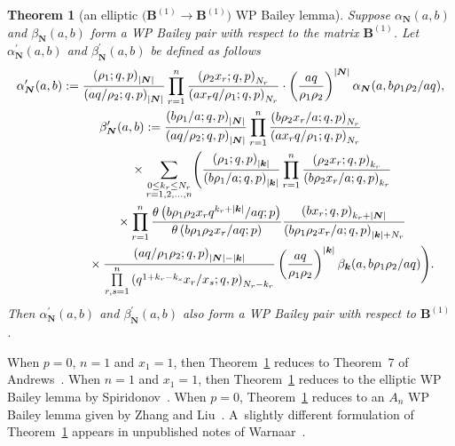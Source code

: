 \documentclass[pdftex]{sigma}
\numberwithin{equation}{section}
\newtheorem{Theorem}{Theorem}[section]
\newenvironment{Remark*}{\begin{remark*}\normalfont}{\end{remark*}}
\newcommand{\sumN}{{\left| \boldsymbol{N} \right|}}
\newcommand\sumk{{\left| \boldsymbol{k} \right|}}
\newcommand{\B}{{ \mathbf B}}
\newcommand{\N}{{ \boldsymbol N}}
\renewcommand{\k}{{ \boldsymbol{k}}}
\newcommand{\multsum}[3]{{\sum\limits_{\substack{{0\le #1_#3 \le #2_#3} \\
{#3 =1,2,\dots, n}}}}}
\newcommand{\sqprod}[1]{\prod\limits_{r, s =1}^{#1}} %
\newcommand{\smallprod}[1]{\prod\limits_{r =1}^{#1}} %
\newcommand{\xover}[1]{#1_{r}/#1_{s}}
\newcommand{\ellipticqrfac}[2]{{\left({#1}; q, p\right)_{#2}}} %
\newcommand{\elliptictheta}[1]{\theta \left({#1} ; p\right) }
\begin{document}
\begin{Theorem}[an elliptic $\big(\B^{(1)} \to\B^{(1)}\big)$ WP Bailey lemma] \label{th:e-WP-BaileyLemma-B1}
Suppose $\alpha_\N(a,b)$ and $\beta_\N(a,b)$ form a WP Bailey pair with respect to the matrix $\B^{(1)}$. Let ${\alpha}^{\prime}_\N(a,b)$ and ${\beta}^{\prime}_\N(a,b)$ be defined as follows
\begin{subequations}
\begin{gather}
{\alpha}^{\prime}_\N(a,b) := \frac{\ellipticqrfac{\rho_1 }{\sumN}}{\ellipticqrfac{aq/\rho_2}{\sumN}}
 \smallprod n \frac{\ellipticqrfac{\rho_2x_r}{N_r}} {\ellipticqrfac{ax_rq/\rho_1}{N_r}}
\cdot \left(\frac{aq}{\rho_1\rho_2}\right)^{\sumN} \alpha_\N(a, b\rho_1\rho_2/aq), \label{e-alphaprime-B1}\\
{\beta}^{\prime}_\N (a,b) :=
\frac{\ellipticqrfac{b\rho_1/a }{\sumN}}{\ellipticqrfac{aq/\rho_2}{\sumN}}
 \smallprod n \frac{\ellipticqrfac{b\rho_2x_r/a}{N_r}}{\ellipticqrfac{ax_rq/\rho_1}{N_r}}\notag \\
\hphantom{{\beta}^{\prime}_\N (a,b) :=}{} \times \multsum{k}{N}{r} \Bigg(
\frac{ \ellipticqrfac{\rho_1}{\sumk} }{\ellipticqrfac{b\rho_1/a}{\sumk}}
\smallprod n \frac{\ellipticqrfac{\rho_2x_r}{k_r}}
{\ellipticqrfac{b\rho_2x_r/a}{k_r}}
 \notag \\
\hphantom{{\beta}^{\prime}_\N (a,b) :=}{}
\times \smallprod n \frac{\elliptictheta{ b\rho_1\rho_2x_rq^{k_r+\sumk}/{aq}}}{\elliptictheta{ b\rho_1\rho_2x_r/{aq}}}
\frac{\ellipticqrfac{bx_r}{k_r+\sumN}}{\ellipticqrfac{b\rho_1\rho_2x_r/a}{\sumk+N_r}} \notag\\
\hphantom{{\beta}^{\prime}_\N (a,b) :=}{}
\times \frac{\ellipticqrfac{aq/\rho_1\rho_2}{\sumN-\sumk} }
{\sqprod n \ellipticqrfac{q^{1+k_r-k_s}\xover x }{N_r-k_r}}
\left(\frac{aq}{\rho_1\rho_2}\right)^{\sumk} \beta_\k(a,b\rho_1\rho_2/aq) \Bigg).\label{e-betaprime-B1}
\end{gather}
\end{subequations}
Then ${\alpha}^{\prime}_\N(a,b)$ and ${\beta}^{\prime}_\N(a,b)$ also form a WP Bailey pair with respect to $\B^{(1)}$.
\end{Theorem}

\begin{Remark*} When $p=0$, $n=1$ and $x_1=1$, then Theorem~\ref{th:e-WP-BaileyLemma-B1} reduces to Theorem~7 of Andrews~\cite{Andrews2001}. When $n=1$ and $x_1=1$, then Theorem~\ref{th:e-WP-BaileyLemma-B1} reduces to the elliptic WP Bailey lemma by Spiridonov~\cite[Theorem~4.3]{VPS2002}. When $p=0$, Theorem~\ref{th:e-WP-BaileyLemma-B1} reduces to an $A_n$ WP Bailey lemma given by Zhang and Liu~\cite{ZL2016}. A~slightly different formulation of Theorem~\ref{th:e-WP-BaileyLemma-B1} appears in unpublished notes of Warnaar~\cite{SOW-notes-2016}.
\end{Remark*}
\end{document}
